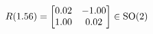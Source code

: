 \documentclass[preview]{standalone}
\begin{document}
\begin{align*}
\special{dvisvgm:raw <g id='unique000'>}R(1.56) = \begin{bmatrix} 0.02 & -1.00 \\ 1.00 & 0.02 \end{bmatrix} \in \text{SO}(2)\special{dvisvgm:raw </g>}
\end{align*}
\end{document}

